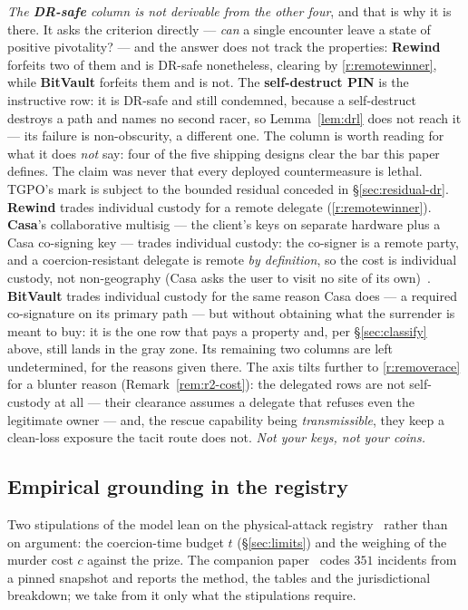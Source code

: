 \emph{The \textbf{DR-safe} column is not derivable from the other four}, and that is why
it is there. It asks the criterion directly --- \emph{can} a single encounter leave a state of
positive pivotality? --- and the answer does not track the properties: \textbf{Rewind}
forfeits two of them and is DR-safe nonetheless, clearing by \ref{r:remotewinner}, while
\textbf{BitVault} forfeits them and is not. The \textbf{self-destruct PIN} is the
instructive row: it is DR-safe and still condemned, because a self-destruct destroys a
path and names no second racer, so Lemma~\ref{lem:drl} does not reach it --- its failure
is non-obscurity, a different one. The column is worth reading for what it does
\emph{not} say: four of the five shipping designs clear the bar this paper defines. The
claim was never that every deployed countermeasure is lethal. TGPO's mark is subject to
the bounded residual conceded in \S\ref{sec:residual-dr}. \textbf{Rewind}
trades individual custody for a remote delegate (\ref{r:remotewinner}). \textbf{Casa}'s collaborative
multisig --- the client's keys on separate hardware plus a Casa co-signing key ---
trades individual custody: the co-signer is a remote party, and a coercion-resistant
delegate is remote \emph{by definition}, so the cost is individual custody, not
non-geography (Casa asks the user to visit no site of its own)~\cite{casa}. \textbf{BitVault} trades individual custody
for the same reason Casa does --- a required co-signature on its primary path --- but
without obtaining what the surrender is meant to buy: it is the one row that pays a
property and, per \S\ref{sec:classify} above, still lands in the gray zone. Its
remaining two columns are left undetermined, for the reasons given there. The axis
tilts further to \ref{r:removerace} for a blunter reason (Remark~\ref{rem:r2-cost}):
the delegated rows are not self-custody at all --- their clearance assumes a
delegate that refuses even the legitimate owner --- and, the rescue capability being
\emph{transmissible}, they keep a clean-loss exposure the tacit route does not.
\emph{Not your keys, not your coins.}

\subsection{Empirical grounding in the registry}
\label{sub:empirical}

Two stipulations of the model lean on the physical-attack
registry~\cite{lopp-attacks} rather than on argument: the coercion-time budget
$t$ (\S\ref{sec:limits}) and the weighing of the murder cost $c$ against the
prize. The companion paper~\cite{denial-spiral} codes $351$ incidents from a
pinned snapshot and reports the method, the tables and the jurisdictional
breakdown; we take from it only what the stipulations require.

